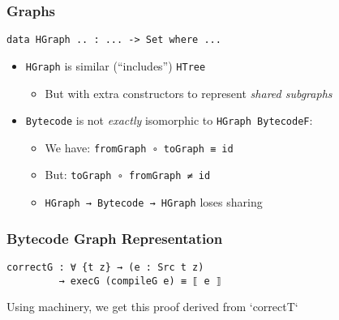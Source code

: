         \begin{frame}[fragile]
            \frametitle{Graphs}

            \begin{verbatim}
data HGraph .. : ... -> Set where ...
            \end{verbatim}
            
            \begin{itemize}
                \item \texttt{HGraph} is similar (``includes'') \texttt{HTree}
                \begin{itemize}
                    \item But with extra constructors to represent \emph{shared subgraphs}
                \end{itemize}
            
                \item \texttt{Bytecode} is not \emph{exactly} isomorphic to \texttt{HGraph BytecodeF}:
                \begin{itemize}
                    \item We have: \texttt{fromGraph ∘ toGraph ≡ id}
                    \item But: \texttt{toGraph ∘ fromGraph ≠ id}
                    \item \texttt{HGraph → Bytecode → HGraph} loses sharing
                \end{itemize}
            \end{itemize}
\end{frame}
         
         \begin{frame}[fragile]
            \frametitle{Bytecode Graph Representation}


            \begin{verbatim}
correctG : ∀ {t z} → (e : Src t z) 
         → execG (compileG e) ≡ ⟦ e ⟧
            \end{verbatim}
            
            Using machinery, we get this proof derived from `correctT`
\end{frame}

